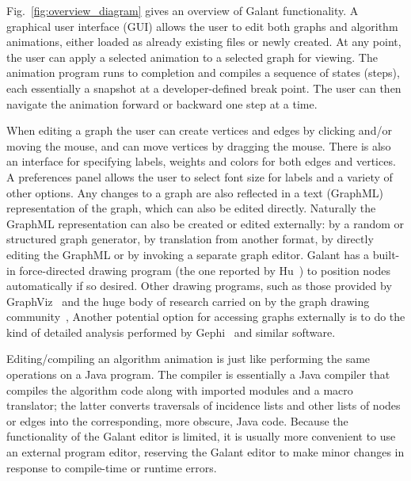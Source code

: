 

Fig.~\ref{fig:overview_diagram} gives an overview of Galant functionality.
A graphical user interface (GUI) allows the user to edit both graphs and
algorithm animations, either loaded as already existing files or newly
created. At any point, the user can apply a selected animation to a selected
graph for viewing.
The animation program runs to completion and compiles a sequence of states (steps),
each essentially a snapshot at a developer-defined break point.
The user can then navigate the animation forward or backward one step at a time.

When editing a graph the user can create vertices and edges by clicking and/or
moving the mouse, and can move vertices by dragging the mouse.
There is also an interface for specifying labels, weights and colors for both
edges and vertices.
A preferences panel allows the user to select font size for labels and a
variety of other options.
Any changes to a graph are also reflected in a text (GraphML) representation
of the graph, which can also be edited directly. Naturally the GraphML
representation can also be created or edited externally: by a random or
structured graph generator, by translation from another format, by directly
editing the GraphML or by invoking a separate graph editor.
Galant has a built-in force-directed drawing program 
(the one reported by Hu~\cite{2006-Mathematica-Hu}) to position nodes
automatically if so desired.
Other drawing programs, such as those provided by GraphViz~\cite{GraphViz}
and the huge body of research carried on by the graph drawing community~\cite{graph_drawing},
Another potential option for accessing graphs externally is to do the kind of
detailed analysis performed by Gephi~\cite{gephi} and similar software.

Editing/compiling an algorithm animation is just like performing the same
operations on a Java program.
The compiler is essentially a Java
compiler that compiles the algorithm code along with imported modules and
a macro translator; the latter converts traversals of incidence lists and other
lists of nodes or edges into the corresponding, more obscure, Java code.
Because the functionality of the Galant editor is limited, it is usually more
convenient to use an external program editor, reserving the Galant editor to
make minor changes in response to compile-time or runtime errors.

